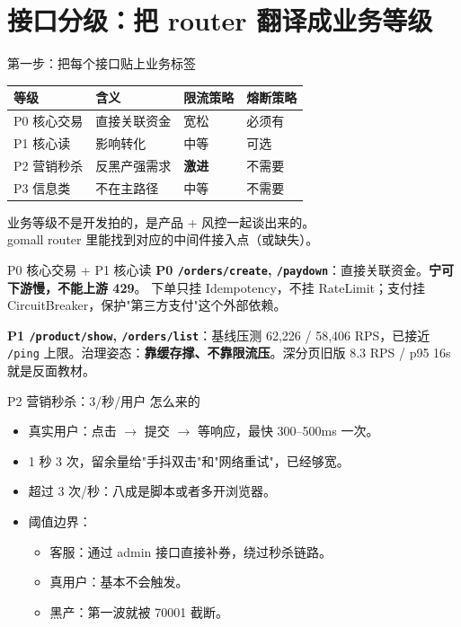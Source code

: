 \section{接口分级：把 router 翻译成业务等级}

\begin{frame}{第一步：把每个接口贴上业务标签}
\begin{tabular}{@{}llll@{}}
\toprule
等级 & 含义 & 限流策略 & 熔断策略 \\
\midrule
P0 核心交易 & 直接关联资金 & 宽松 & 必须有 \\
P1 核心读   & 影响转化       & 中等 & 可选 \\
P2 营销秒杀 & 反黑产强需求   & \textbf{激进} & 不需要 \\
P3 信息类   & 不在主路径     & 中等 & 不需要 \\
\bottomrule
\end{tabular}
\vspace{2mm}
\small 业务等级不是开发拍的，是产品 + 风控一起谈出来的。\\
gomall router 里能找到对应的中间件接入点（或缺失）。
\end{frame}

\begin{frame}{P0 核心交易 + P1 核心读}
\textbf{P0 \texttt{/orders/create}, \texttt{/paydown}}：直接关联资金。\textbf{宁可下游慢，不能上游 429}。
下单只挂 Idempotency，不挂 RateLimit；支付挂 CircuitBreaker，保护"第三方支付"这个外部依赖。

\vspace{2mm}
\textbf{P1 \texttt{/product/show}, \texttt{/orders/list}}：基线压测 62{,}226 / 58{,}406 RPS，已接近 \texttt{/ping} 上限。治理姿态：\textbf{靠缓存撑、不靠限流压}。深分页旧版 8.3 RPS / p95 16s 就是反面教材。
\end{frame}

\begin{frame}{P2 营销秒杀：3/秒/用户 怎么来的}
\begin{itemize}
  \item 真实用户：点击 $\to$ 提交 $\to$ 等响应，最快 300--500ms 一次。
  \item 1 秒 3 次，留余量给"手抖双击"和"网络重试"，已经够宽。
  \item 超过 3 次/秒：八成是脚本或者多开浏览器。
  \item 阈值边界：
  \begin{itemize}
    \item 客服：通过 admin 接口直接补券，绕过秒杀链路。
    \item 真用户：基本不会触发。
    \item 黑产：第一波就被 70001 截断。
  \end{itemize}
\end{itemize}
\end{frame}

